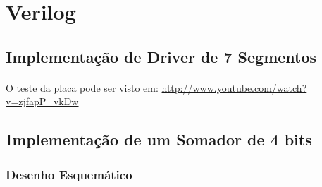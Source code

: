 \section{Verilog}
\renewcommand\thesubsubsection{\Alph{section}.\arabic{subsection}.\arabic{subsubsection}}
\subsection{Implementação de Driver de 7 Segmentos}
    \paragraph{} O teste da placa pode ser visto em:
    \url{http://www.youtube.com/watch?v=zjfapP_vkDw}
    
\subsection{Implementação de um Somador de 4 bits}



\subsubsection{Desenho Esquemático}

